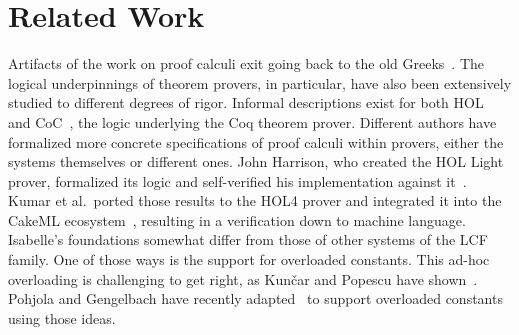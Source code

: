 \chapter{Related Work}\label{chapter:related}

Artifacts of the work on proof calculi exit going back to the old Greeks~\parencite{Lukasiewicz1951}.
The logical underpinnings of theorem provers, in particular, have also been extensively studied to different degrees of rigor.
Informal descriptions exist for both HOL~\parencite{Gordon94} and CoC~\parencite{Huet88}, the logic underlying the Coq theorem prover.
Different authors have formalized more concrete specifications of proof calculi within provers, either the systems themselves or different ones.
John Harrison, who created the HOL Light prover, formalized its logic and self-verified his implementation against it~\parencite{Harrison06}.
Kumar et al.\ ported those results to the HOL4 prover and integrated it into the CakeML ecosystem~\parencite{Kumar2016}, resulting in a verification down to machine language.\\

Isabelle's foundations somewhat differ from those of other systems of the LCF family.
One of those ways is the support for overloaded constants.
This ad-hoc overloading is challenging to get right, as Kun{\v c}ar and Popescu have shown~\parencite{Kuncar19}.
Pohjola and Gengelbach have recently adapted~\parencite{Kumar2016} to support overloaded constants using those ideas.